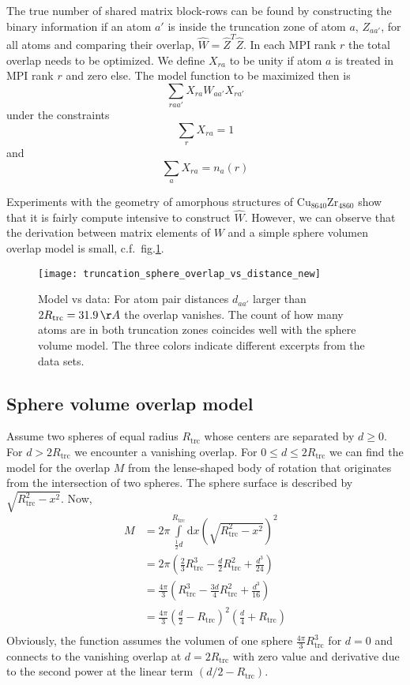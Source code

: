 \documentclass[a4paper]{article}
\newcommand{\MPIrank}{MPI rank} %
\newcommand{\um}[1]{_{\mathrm{#1}}}
\begin{document}
The true number of shared matrix block-rows can be found by constructing the binary information
if an atom $a'$ is inside the truncation zone of atom $a$, $Z_{aa'}$, 
for all atoms and comparing their overlap, $\hat W = \hat Z^T \hat Z$.
In each \MPIrank{} $r$ the total overlap needs to be optimized.
We define $X_{ra}$ to be unity if atom $a$ is treated in \MPIrank{} $r$ and zero else.
The model function to be maximized then is 
$$ \sum_{raa'} X_{ra} W_{aa'} X_{ra'} $$
under the constraints
$$ \sum_{r} X_{ra} = 1 $$
and
$$ \sum_{a} X_{ra} = n_{a}(r) $$

Experiments with the geometry of amorphous structures of $\mathrm{Cu}_{8640}\mathrm{Zr}_{4860}$
show that it is fairly compute intensive to construct $\hat W$.
However, we can observe that the derivation between matrix elements of $W$ and a simple
sphere volumen overlap model is small, c.f.~fig.\ref{fig:truncation_sphere_overlap_vs_distance}.

\begin{figure}[h!]
\begin{center}
  \texttt{[image: truncation\_sphere\_overlap\_vs\_distance\_new]}
  \caption{Model vs data:
  For atom pair distances $d_{aa'}$ larger than $2R\um{trc} = 31.9\,\AA$ the overlap vanishes.
  The count of how many atoms are in both truncation zones coincides well with the sphere volume model.
  The three colors indicate different excerpts from the data sets.
  }
\end{center}
\label{fig:truncation_sphere_overlap_vs_distance}
\end{figure}

\subsection{Sphere volume overlap model}

Assume two spheres of equal radius $R\um{trc}$ whose centers are separated by $d \geq 0$.
For $d > 2 R\um{trc}$ we encounter a vanishing overlap.
For $0 \leq d \leq 2 R\um{trc}$ we can find the model for the overlap $M$ from the lense-shaped body of rotation that
originates from the intersection of two spheres.
The sphere surface is described by $\sqrt{R\um{trc}^2 - x^2}$.
Now,
\begin{align*}
  M &= 2 \pi \int\limits_{\frac 12 d}^{R\um{trc}} \mathrm d x \left( \sqrt{ R\um{trc}^2 - x^2 } \right)^2 \\
    &= 2 \pi \left( \frac 23 R\um{trc}^3 - \frac d2 R\um{trc}^2 + \frac{d^3}{24} \right) \\
    &= \frac{4\pi}{3} \left( R\um{trc}^3 - \frac{3d}{4} R\um{trc}^2 + \frac{d^3}{16} \right) \\
    &= \frac{4\pi}{3} \left( \frac d2 - R\um{trc} \right)^2 \left(\frac d4 + R\um{trc} \right) \\
\end{align*}
Obviously, the function assumes the volumen of one sphere $\frac{4\pi}{3} R\um{trc}^3$ for $d=0$
and connects to the vanishing overlap at $d=2R\um{trc}$ with zero value and derivative 
due to the second power at the linear term $(d/2 - R\um{trc})$.
\end{document}
